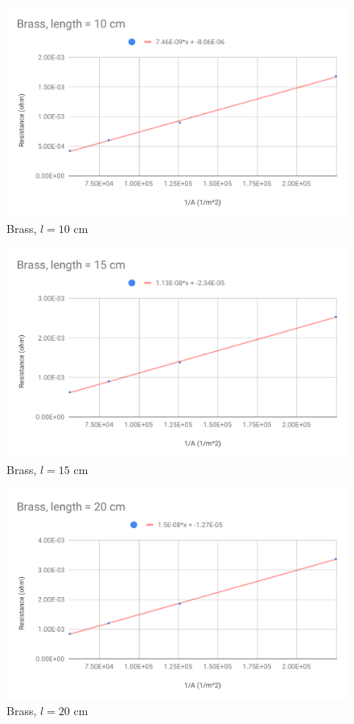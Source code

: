 %
\begin{figure}[ht]
	\centering
	\includegraphics[scale=0.74]{image/02-resistance/10cm.pdf}
	\caption{Brass, $l = 10$ cm}
	\label{figure.02.10cm}
\end{figure}
%
\begin{figure}[ht]
	\centering
	\includegraphics[scale=0.74]{image/02-resistance/15cm.pdf}
	\caption{Brass, $l = 15$ cm}
	\label{figure.02.15cm}
\end{figure}
%
\begin{figure}[ht]
	\centering
	\includegraphics[scale=0.74]{image/02-resistance/20cm.pdf}
	\caption{Brass, $l = 20$ cm}
	\label{figure.02.20cm}
\end{figure}
